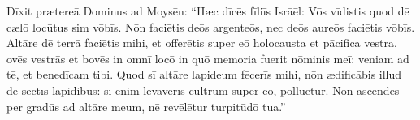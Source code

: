 Dīxit prætereā Dominus ad
Moysēn: ``Hæc dīcēs fīliīs Isrāēl: Vōs
vīdistis quod dē cælō locūtus sim vōbīs. 
Nōn faciētis deōs argenteōs,
nec deōs aureōs faciētis vōbīs. 
Altāre dē terrā faciētis mihi, et
offerētis super eō holocausta et
pācifica vestra, ovēs vestrās et bovēs
in omnī locō in quō memoria fuerit nōminis meī: veniam ad tē, et
benedīcam tibi. 
Quod sī altāre lapideum
fēcerīs mihi, nōn ædificābis illud dē sectīs lapidibus: sī
enim levāverīs cultrum super eō, polluētur. 
Nōn ascendēs
per gradūs ad altāre meum, nē revēlētur
turpitūdō tua.''
